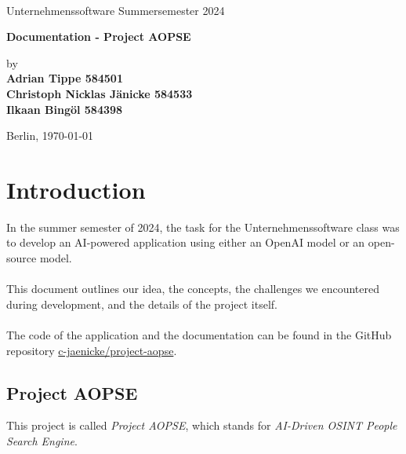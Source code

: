\documentclass[
    a4paper,
    pagesize,
	pdftex,
    12pt,
]{scrartcl}
\begin{document}
\begin{titlepage}
    \begin{center}
         \\
        \vspace{1.0cm}

        Unternehmenssoftware Summersemester 2024
    
        \vspace{1.5cm}   

        \textbf{Documentation - Project AOPSE}

        \vspace{1.5cm}

        by \\
        \textbf{Adrian Tippe 584501} \\
        \textbf{Christoph Nicklas Jänicke 584533}\\
        \textbf{Ilkaan Bingöl 584398}

        \vspace{1.5cm}    
        Berlin, \today\\
    \end{center}
\end{titlepage}


\thispagestyle{empty}
\tableofcontents
\newpage


\section{Introduction}
In the summer semester of 2024, the task for the Unternehmenssoftware class was to develop an AI-powered application using either an OpenAI model or an open-source model.
\\ \\
This document outlines our idea, the concepts, the challenges we encountered during development, and the details of the project itself.
\\ \\
The code of the application and the documentation can be found in the GitHub repository \hyperlink{https://github.com/c-jaenicke/project-aopse}{c-jaenicke/project-aopse}.

\subsection{Project AOPSE}
This project is called \textit{Project AOPSE}, which stands for \textit{AI-Driven OSINT People Search Engine}.
\end{document}
